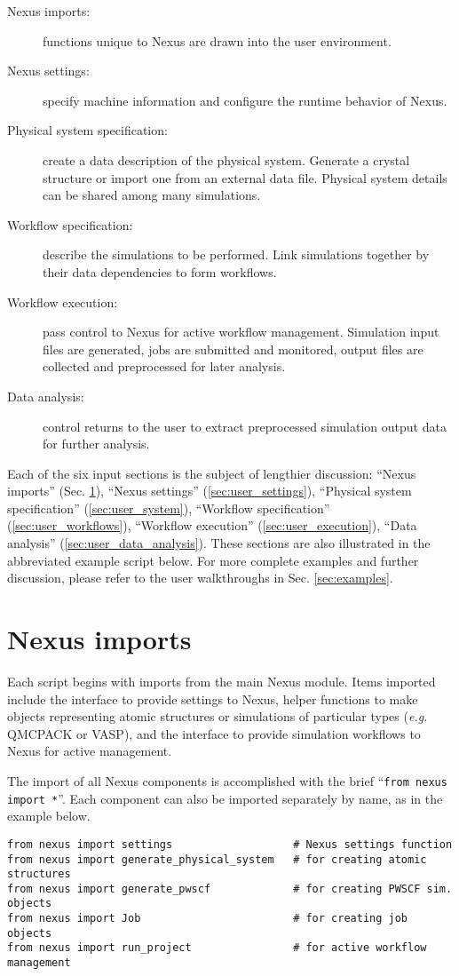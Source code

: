\documentclass[oneside,11pt]{memoir}
\numberwithin{equation}{section}
\begin{document}
\begin{description}
  \item[Nexus imports:] functions unique to Nexus are drawn into the user environment.
  \item[Nexus settings:] specify machine information and configure the runtime behavior of Nexus.
  \item[Physical system specification:]  create a data description of the physical system.  Generate a crystal structure or import one from an external data file.  Physical system details can be shared among many simulations.
  \item[Workflow specification:] describe the simulations to be performed.  Link simulations together by their data dependencies to form workflows.
  \item[Workflow execution:] pass control to Nexus for active workflow management.  Simulation input files are generated, jobs are submitted and monitored, output files are collected and preprocessed for later analysis.
  \item[Data analysis:] control returns to the user to extract preprocessed simulation output data for further analysis. 
\end{description}


Each of the six input sections is the subject of lengthier discussion: ``Nexus imports'' (Sec. \ref{sec:user_imports}), ``Nexus settings'' (\ref{sec:user_settings}), ``Physical system specification'' (\ref{sec:user_system}),  ``Workflow specification'' (\ref{sec:user_workflows}), ``Workflow execution'' (\ref{sec:user_execution}), ``Data analysis'' (\ref{sec:user_data_analysis}).  These sections are also illustrated in the abbreviated example script below.  For more complete examples and further discussion, please refer to the user walkthroughs in Sec. \ref{sec:examples}.



\section{Nexus imports}\label{sec:user_imports}
Each script begins with imports from the main Nexus module.  Items imported include the interface to provide settings to Nexus, helper functions to make objects representing atomic structures or simulations of particular types (\emph{e.g.} QMCPACK or VASP), and the interface to provide simulation workflows to Nexus for active management. 

The import of all Nexus components is accomplished with the brief ``\texttt{from nexus import *}''.  Each component can also be imported separately by name, as in the example below.
\begin{verbatim}
from nexus import settings                   # Nexus settings function
from nexus import generate_physical_system   # for creating atomic structures
from nexus import generate_pwscf             # for creating PWSCF sim. objects
from nexus import Job                        # for creating job objects
from nexus import run_project                # for active workflow management
\end{verbatim}
\end{document}
